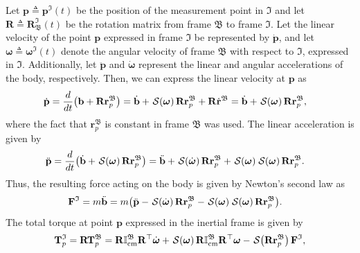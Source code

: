 Let $\mathbf{p}\triangleq\mathbf{p}^\mathfrak{I}(t)$ be the position of the measurement point in $\mathfrak{I}$ and let $\mathbf{R}\triangleq \mathbf{R}_\mathfrak{B}^\mathfrak{I}(t)$ be the rotation matrix from frame $\mathfrak{B}$ to frame $\mathfrak{I}$. Let the linear velocity of the point $\mathbf{p}$ expressed in frame $\mathfrak{I}$ be represented by $\dot{\mathbf{p}}$, and let $\boldsymbol{\omega}\triangleq\boldsymbol{\omega}^\mathfrak{I}(t)$ denote the angular velocity of frame $\mathfrak{B}$ with respect to $\mathfrak{I}$, expressed in $\mathfrak{I}$. Additionally, let $\ddot{\mathbf{p}}$ and $\dot{\boldsymbol{\omega}}$ represent the linear and angular accelerations of the body, respectively. Then, we can express the linear velocity at $\mathbf{p}$ as
\begin{align}
    \dot{\mathbf{p}} &= \frac{d}{dt}\bigl(\mathbf{b} + \mathbf{R}\mathbf{r}^\mathfrak{B}_p\bigr) 
    = \dot{\mathbf{b}} +\SL[\boldsymbol{\omega}]\mathbf{R}\mathbf{r}^\mathfrak{B}_p + \mathbf{R}\dot{\mathbf{r}}^\mathfrak{B} = \dot{\mathbf{b}} +\SL[\boldsymbol{\omega}]\mathbf{R}\mathbf{r}^\mathfrak{B}_p,
\end{align}
where the fact that $\mathbf{r}^\mathfrak{B}_p$ is constant in frame $\mathfrak{B}$ was used. The linear acceleration is given by
\begin{align}
    \ddot{\mathbf{p}} &= \frac{d}{dt}\bigl(\dot{\mathbf{b}} +\SL[\boldsymbol{\omega}]\mathbf{R}\mathbf{r}^\mathfrak{B}_p\bigr) 
    = \ddot{\mathbf{b}} + \SL[\dot{\boldsymbol{\omega}}]\mathbf{R}\mathbf{r}^\mathfrak{B}_p + \SL[\boldsymbol{\omega}]\SL[\boldsymbol{\omega}]\mathbf{R}\mathbf{r}^\mathfrak{B}_p.
\end{align}
Thus, the resulting force acting on the body is given by Newton's second law as
\begin{align}
    \mathbf{F}^\mathfrak{I}&=m\ddot{\mathbf{b}} = m\bigl(\ddot{\mathbf{p}} - \SL[\dot{\boldsymbol{\omega}}]\mathbf{R}\mathbf{r}^\mathfrak{B}_p - \SL[\boldsymbol{\omega}]\SL[\boldsymbol{\omega}]\mathbf{R}\mathbf{r}^\mathfrak{B}_p\bigr).
\end{align}
The total torque at point $\mathbf{p}$ expressed in the inertial frame is given by
\begin{align}
    \mathbf{T}^\mathfrak{I}_p = \mathbf{R}\mathbf{T}^\mathfrak{B}_p = \mathbf{R}\mathbb{I}^\mathfrak{B}_\text{cm}\mathbf{R}^\top\dot{\boldsymbol{\omega}} + \SL[\boldsymbol{\omega}]\mathbf{R}\mathbb{I}^\mathfrak{B}_\text{cm}\mathbf{R}^\top\boldsymbol{\omega} - \SL[\mathbf{R}\mathbf{r}^\mathfrak{B}_p]\mathbf{F}^\mathfrak{I}, \label{eq:torque-modelling}
\end{align}
